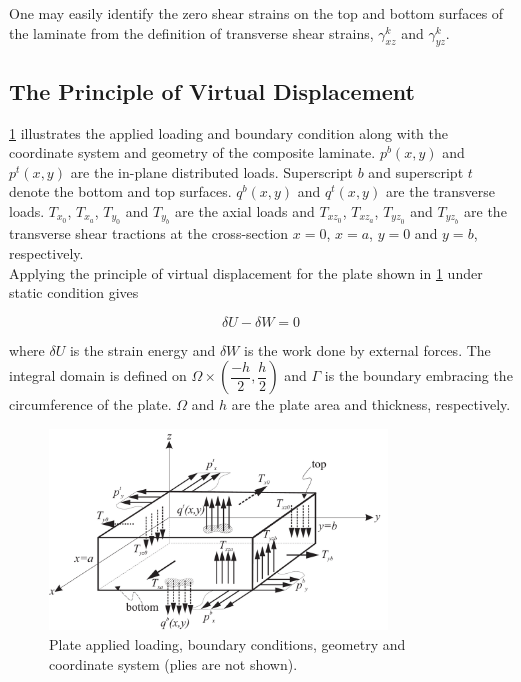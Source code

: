 \documentclass{article}
\begin{document}
One may easily identify the zero shear strains on the top and bottom surfaces of the laminate from the definition of transverse shear strains, $\gamma^k_{xz}$ and $\gamma^k_{yz}$.

\subsection{The Principle of Virtual Displacement}
\cref{fig:loading} illustrates the applied loading and boundary condition along with the coordinate system and geometry of the composite laminate. $p^b(x, y)$ and $p^t(x, y)$ are the in-plane distributed loads. Superscript $b$ and superscript $t$ denote the bottom and top surfaces. $q^b(x, y)$ and $q^t(x, y)$ are the transverse loads. $T_{x_0}$, $T_{x_a}$, $T_{y_0}$ and $T_{y_b}$ are the axial loads and $T_{{xz}_0}$, $T_{{xz}_a}$, $T_{{yz}_0}$ and $T_{{yz}_b}$ are the transverse shear tractions at the cross-section $x=0$, $x=a$, $y=0$ and $y=b$, respectively. \\

Applying the principle of virtual displacement for the plate shown in \cref{fig:loading} under static condition gives

\begin{equation}
    \delta U - \delta W = 0
    \label{eq:wvp}
\end{equation}

where $\delta U$ is the strain energy and $\delta W$ is the work done by external forces. The integral domain is defined on $\Omega \times (\dfrac{-h}{2}, \dfrac{h}{2})$ and $\Gamma$ is the boundary embracing the circumference of the plate. $\Omega$ and $h$ are the plate area and thickness, respectively. 

\begin{figure}[ht]
    \centering
    \includegraphics[width = 0.8\textwidth ]{figures/loading.pdf}
    \caption{Plate applied loading, boundary conditions, geometry and coordinate system (plies are not shown).}
    \label{fig:loading}
\end{figure}
\end{document}
